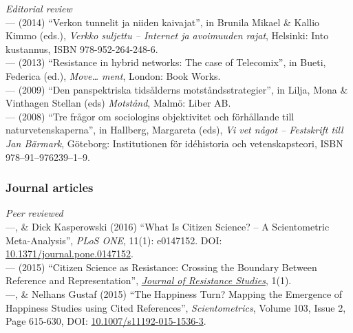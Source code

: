 \documentclass[a4paper,11pt,oneside]{article}
\begin{document}
  \noindent \emph{Editorial review} \\
  --- (2014) ``Verkon tunnelit ja niiden kaivajat'', in Brunila Mikael \& Kallio Kimmo (eds.), \emph{Verkko suljettu – Internet ja avoimuuden rajat}, Helsinki: Into kustannus, ISBN 978-952-264-248-6.\\
  --- (2013) ``Resistance in hybrid networks: The case of Telecomix'', in Bueti, Federica (ed.), \emph{Move… ment}, London: Book Works.\\
  --- (2009) ``Den panspektriska tidsålderns motståndsstrategier'', in Lilja, Mona \& Vinthagen Stellan (eds) \emph{Motstånd}, Malmö: Liber AB.\\
  --- (2008) ``Tre frågor om sociologins objektivitet och förhållande till naturvetenskaperna'', in Hallberg, Margareta (eds), \emph{Vi vet något – Festskrift till Jan Bärmark}, Göteborg: Institutionen för idéhistoria och vetenskapsteori, ISBN 978–91–976239–1–9.\\

\subsubsection{Journal articles}
  \noindent  \emph{Peer reviewed} \\
  ---, \& Dick Kasperowski (2016) ``What Is Citizen Science? – A Scientometric Meta-Analysis'', \emph{PLoS ONE}, 11(1): e0147152. DOI: \href{http://dx.doi.org/10.1371/journal.pone.0147152}{10.1371/journal.pone.0147152}.\\
  --- (2015) ``Citizen Science as Resistance: Crossing the Boundary Between Reference and Representation'', \href{https://gup.ub.gu.se/publication/218601-citizen-science-as-resistance-crossing-the-boundary-between-reference-and-representation}{\emph{Journal of Resistance Studies}}, 1(1).\\
  ---, \& Nelhans Gustaf (2015) ``The Happiness Turn? Mapping the Emergence of Happiness Studies using Cited References'', \emph{Scientometrics}, Volume 103, Issue 2, Page 615-630, DOI: \href{http://dx.doi.org/10.1007/s11192-015-1536-3}{10.1007/s11192-015-1536-3}.\\
\end{document}
